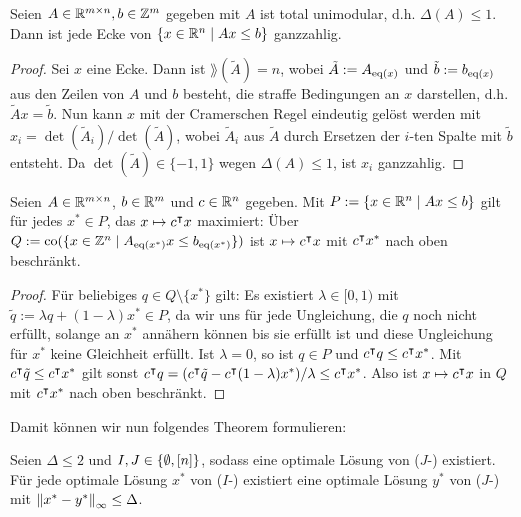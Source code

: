 \begin{lemma}\label{lem:unimodular}
	Seien $A\in\mathbb{R}^{m\times n},b\in\mathbb{Z}^m$ gegeben mit $A$ ist total unimodular, d.h. $\Delta(A)\leq 1$. Dann ist jede Ecke von $\{x\in\mathbb{R}^n \mid Ax\leq b \}$ ganzzahlig.
\end{lemma}
\begin{proof}
	Sei $x$ eine Ecke. Dann ist $\rang(\tilde{A})=n$, wobei $\tilde{A} := A_{\operatorname{eq}(x)}$ und $\tilde{b}:=b_{\operatorname{eq}(x)}$ aus den Zeilen von $A$ und $b$ besteht, die straffe Bedingungen an $x$ darstellen, d.h. $\tilde{A} x = \tilde{b}$.
	Nun kann $x$ mit der Cramerschen Regel eindeutig gelöst werden mit $x_i=\det(\tilde{A}_i)/\det(\tilde{A})$, wobei $\tilde{A}_i$ aus $\tilde{A}$ durch Ersetzen der $i$-ten Spalte mit $\tilde{b}$ entsteht.
	Da $\det(\tilde{A})\in\{-1,1\}$ wegen $\Delta(A)\leq 1$, ist $x_i$ ganzzahlig.
\end{proof}
\begin{lemma}\label{lem:q-upper-bound}
	Seien $A\in\mathbb{R}^{m\times n}$, $b\in\mathbb{R}^m$ und $c\in\mathbb{R}^n$ gegeben.
	Mit $P:=\{ x\in\mathbb{R}^n \mid Ax\leq b \}$ gilt für jedes $x^*\in P$, das $x\mapsto c^\intercal x$ maximiert:
	Über $Q:=\operatorname{co}(\{x\in\mathbb{Z}^n \mid A_{\operatorname{eq}(x^*)}x \leq b_{\operatorname{eq}(x^*)} \})$ ist  $x\mapsto c^\intercal x$ mit $c^\intercal x^*$ nach oben beschränkt.
\end{lemma}
\begin{proof}
	Für beliebiges $q\in Q\setminus\{x^*\}$ gilt:
	Es existiert $\lambda\in[0,1)$ mit $\tilde{q}:=\lambda q+(1-\lambda)x^*\in P$, da wir uns für jede Ungleichung, die $q$ noch nicht erfüllt, solange an $x^*$ annähern können bis sie erfüllt ist und diese Ungleichung für $x^*$ keine Gleichheit erfüllt.
	Ist $\lambda=0$, so ist $q\in P$ und $c^\intercal q\leq c^\intercal x^*$. Mit $c^\intercal \tilde{q} \leq c^\intercal x^*$ gilt sonst $c^\intercal q=(c^\intercal \tilde{q} - c^\intercal(1-\lambda)x^*)/\lambda \leq c^\intercal x^*$.
	Also ist $x\mapsto c^\intercal x$ in $Q$ mit $c^\intercal x^*$ nach oben beschränkt.
\end{proof}
Damit können wir nun folgendes Theorem formulieren:
\begin{theorem}
		Seien $\Delta\leq 2$ und $I,J\in\{\emptyset,[n]\}$, sodass eine optimale Lösung von ($J$-\MIPI) existiert.
		Für jede optimale Lösung $x^*$ von ($I$-\MIPI) existiert eine optimale Lösung $y^*$ von ($J$-\MIPI) mit $\left\lVert x^*-y^*\right\rVert_\infty\leq \Delta$.
\end{theorem}
